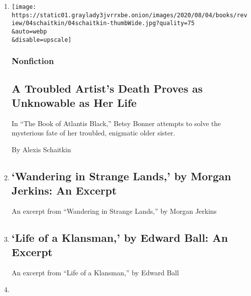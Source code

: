 \begin{enumerate}
\def\labelenumi{\arabic{enumi}.}
\item
  \href{/2020/08/04/books/review/betsy-bonner-the-book-of-atlantis-black.html}{}

  \texttt{[image: https://static01.graylady3jvrrxbe.onion/images/2020/08/04/books/review/04schaitkin/04schaitkin-thumbWide.jpg?quality=75\\\&auto=webp\\\&disable=upscale]}

  \hypertarget{nonfiction}{%
  \subsubsection{Nonfiction}\label{nonfiction}}

  \hypertarget{a-troubled-artists-death-proves-as-unknowable-as-her-life}{%
  \subsection{A Troubled Artist's Death Proves as Unknowable as Her
  Life}\label{a-troubled-artists-death-proves-as-unknowable-as-her-life}}

  In ``The Book of Atlantis Black,'' Betsy Bonner attempts to solve the
  mysterious fate of her troubled, enigmatic older sister.

  By Alexis Schaitkin
\item
  \href{/2020/08/04/books/review/wandering-in-strange-lands-by-morgan-jerkins-an-excerpt.html}{}

  \hypertarget{wandering-in-strange-lands-by-morgan-jerkins-an-excerpt}{%
  \subsection{`Wandering in Strange Lands,' by Morgan Jerkins: An
  Excerpt}\label{wandering-in-strange-lands-by-morgan-jerkins-an-excerpt}}

  An excerpt from ``Wandering in Strange Lands,'' by Morgan Jerkins
\item
  \href{/2020/08/04/books/review/life-of-a-klansman-by-edward-ball-an-excerpt.html}{}

  \hypertarget{life-of-a-klansman-by-edward-ball-an-excerpt}{%
  \subsection{`Life of a Klansman,' by Edward Ball: An
  Excerpt}\label{life-of-a-klansman-by-edward-ball-an-excerpt}}

  An excerpt from ``Life of a Klansman,'' by Edward Ball
\item
  \href{/2020/08/04/magazine/behrouz-boochani-australia.html}{}


\end{enumerate}
